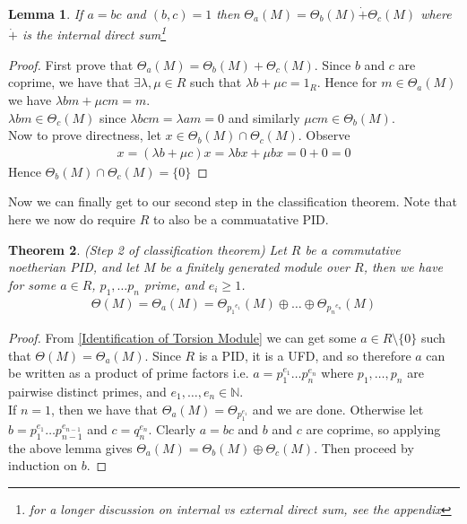 \documentclass[12pt]{book}
\newtheorem{theorem}{Theorem}[chapter]
\newtheorem{lemma}[theorem]{Lemma}
\theoremstyle{definition}
\begin{document}
\begin{lemma}
    If $a = bc$ and $(b,c) = 1$ then $\Theta_a(M) = \Theta_b(M) \dot{+} \Theta_c(M)$ where $\dot{+}$ is the internal direct sum\footnote{for a longer discussion on internal vs external direct sum, see the appendix}
\end{lemma}
\begin{proof}
    First prove that $\Theta_a(M) = \Theta_b(M) + \Theta_c(M)$. Since $b$ and $c$ are coprime, we have that $\exists \lambda, \mu \in R$ such that $\lambda b + \mu c = 1_R$. Hence for $m \in \Theta_a(M)$ we have $\lambda b m + \mu c m = m$. \\
    $\lambda b m \in \Theta_c(M)$ since $\lambda b c m = \lambda a m = 0$ and similarly $\mu c m \in \Theta_b(M)$.\\
    Now to prove directness, let $x \in \Theta_b(M) \cap \Theta_c(M)$. Observe 
    \begin{align*}
        x = (\lambda b + \mu c)x = \lambda b x + \mu b x = 0 + 0 = 0
    \end{align*}
    Hence $\Theta_b(M) \cap \Theta_c(M) = \{0\}$
\end{proof}

Now we can finally get to our second step in the classification theorem. Note that here we now do require $R$ to also be a commuatative PID.

\begin{theorem}
    (Step 2 of classification theorem) Let $R$ be a commutative noetherian PID, and let $M$ be a finitely generated module over $R$, then we have for some $a \in R$, $p_1, \dots p_n$ prime, and $e_i \geq 1$.  
    \begin{align*}
        \Theta(M) = \Theta_a(M) = \Theta_{{p_1}^{e_1}}(M) \oplus \dots \oplus \Theta_{{p_n}^{e_n}}(M)
    \end{align*}
\end{theorem}
\begin{proof}
    From \ref{Identification of Torsion Module} we can get some $a \in R\setminus \{0\}$ such that $\Theta(M) = \Theta_a(M)$. Since $R$ is a PID, it is a UFD, and so therefore $a$ can be written as a product of prime factors i.e. $a = p_1^{e_1} \dots p_n^{e_n}$ where $p_1, \dots, p_n$ are pairwise distinct primes, and $e_1, \dots, e_n \in \mathbb{N}$.\\
    If $n=1$, then we have that $\Theta_a(M) = \Theta_{p_1^{e_1}}$ and we are done. Otherwise let $b =  p_1^{e_1} \dots p_{n-1}^{e_{n-1}}$ and $c = q_n^{e_n}$. Clearly $a = bc$ and $b$ and $c$ are coprime, so applying the above lemma gives $\Theta_a(M) = \Theta_b(M) \oplus \Theta_c(M)$. Then proceed by induction on $b$. 
\end{proof}
\end{document}
